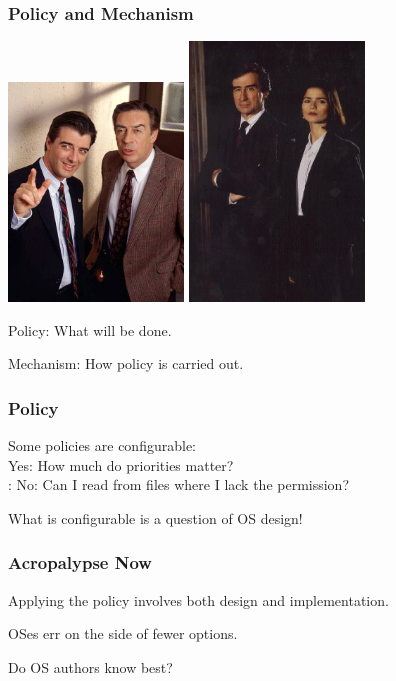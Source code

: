\begin{frame}
\frametitle{Policy and Mechanism}

\begin{center}
	\includegraphics[width=0.35\textwidth]{images/briscoe-logan.jpg}
	\includegraphics[width=0.35\textwidth]{images/mccoy-kincaid.jpg}
\end{center}

Policy: What will be done.

Mechanism: How policy is carried out.

\end{frame}

\begin{frame}
\frametitle{Policy}
Some policies are configurable:\\
\quad Yes: How much do priorities matter?\\
\quad: No: Can I read from files where I lack the permission?

What is configurable is a question of OS design!

\end{frame}

\begin{frame}
\frametitle{Acropalypse Now}

Applying the policy involves both design and implementation.

OSes err on the side of fewer options.

Do OS authors know best?

\end{frame}

